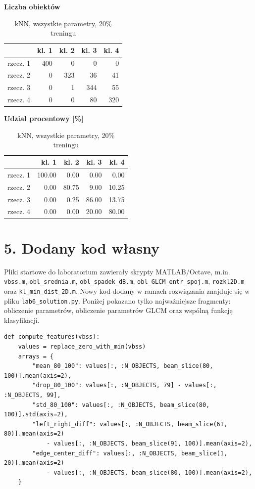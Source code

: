\documentclass[11pt,a4paper]{article}
\begin{document}
\begin{table}[H]
\centering
\small
\caption{kNN, wszystkie parametry, 20\% treningu}
\begin{minipage}{0.47\textwidth}
\centering
\textbf{Liczba obiektów}\\[0.35em]
\begin{tabular}{lrrrr}
\toprule
 & kl. 1 & kl. 2 & kl. 3 & kl. 4 \\
\midrule
rzecz. 1 & 400 & 0 & 0 & 0 \\
rzecz. 2 & 0 & 323 & 36 & 41 \\
rzecz. 3 & 0 & 1 & 344 & 55 \\
rzecz. 4 & 0 & 0 & 80 & 320 \\
\bottomrule
\end{tabular}
\end{minipage}\hfill
\begin{minipage}{0.47\textwidth}
\centering
\textbf{Udział procentowy [\%]}\\[0.35em]
\begin{tabular}{lrrrr}
\toprule
 & kl. 1 & kl. 2 & kl. 3 & kl. 4 \\
\midrule
rzecz. 1 & 100.00 & 0.00 & 0.00 & 0.00 \\
rzecz. 2 & 0.00 & 80.75 & 9.00 & 10.25 \\
rzecz. 3 & 0.00 & 0.25 & 86.00 & 13.75 \\
rzecz. 4 & 0.00 & 0.00 & 20.00 & 80.00 \\
\bottomrule
\end{tabular}
\end{minipage}
\end{table}


\section*{5. Dodany kod własny}
Pliki startowe do laboratorium zawierały skrypty MATLAB/Octave, m.in. \texttt{vbss.m}, \texttt{obl\_srednia.m}, \texttt{obl\_spadek\_dB.m}, \texttt{obl\_GLCM\_entr\_spoj.m}, \texttt{rozkl2D.m} oraz \texttt{kl\_min\_dist\_2D.m}. Nowy kod dodany w ramach rozwiązania znajduje się w pliku \texttt{lab6\_solution.py}. Poniżej pokazano tylko najważniejsze fragmenty: obliczenie parametrów, obliczenie parametrów GLCM oraz wspólną funkcję klasyfikacji.


\begin{lstlisting}[caption={Fragment własnego kodu: obliczanie parametrów BSS.}]
def compute_features(vbss):
    values = replace_zero_with_min(vbss)
    arrays = {
        "mean_80_100": values[:, :N_OBJECTS, beam_slice(80, 100)].mean(axis=2),
        "drop_80_100": values[:, :N_OBJECTS, 79] - values[:, :N_OBJECTS, 99],
        "std_80_100": values[:, :N_OBJECTS, beam_slice(80, 100)].std(axis=2),
        "left_right_diff": values[:, :N_OBJECTS, beam_slice(61, 80)].mean(axis=2)
            - values[:, :N_OBJECTS, beam_slice(91, 100)].mean(axis=2),
        "edge_center_diff": values[:, :N_OBJECTS, beam_slice(1, 20)].mean(axis=2)
            - values[:, :N_OBJECTS, beam_slice(80, 100)].mean(axis=2),
    }
\end{lstlisting}
\end{document}
